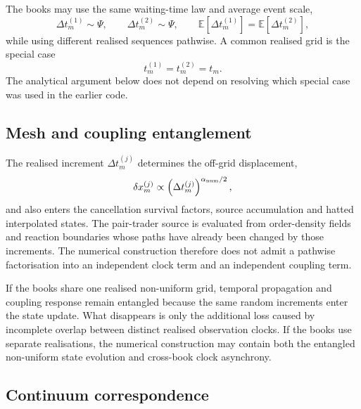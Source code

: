 \documentclass[5p,final]{elsarticle}
\begin{document}
The books may use the same waiting-time law and average event scale,
\begin{equation}
    \Delta t_m^{(1)}\sim\Psi,
    \qquad
    \Delta t_m^{(2)}\sim\Psi,
    \qquad
    \mathbb E[\Delta t_m^{(1)}]
    =\mathbb E[\Delta t_m^{(2)}],
\end{equation}
while using different realised sequences pathwise. A common realised grid is the special case
\begin{equation}
    t_m^{(1)}=t_m^{(2)}=t_m.
\end{equation}
The analytical argument below does not depend on resolving which special case was used in the earlier code.

\subsection{Mesh and coupling entanglement}

The realised increment $\Delta t_m^{(j)}$ determines the off-grid displacement,
\begin{equation}
    \delta x_m^{(j)}
    \propto
    \left(\Delta t_m^{(j)}\right)^{\alpha_{\rm num}/2},
\end{equation}
and also enters the cancellation survival factors, source accumulation and hatted interpolated states. The pair-trader source is evaluated from order-density fields and reaction boundaries whose paths have already been changed by those increments. The numerical construction therefore does not admit a pathwise factorisation into an independent clock term and an independent coupling term.

If the books share one realised non-uniform grid, temporal propagation and coupling response remain entangled because the same random increments enter the state update. What disappears is only the additional loss caused by incomplete overlap between distinct realised observation clocks. If the books use separate realisations, the numerical construction may contain both the entangled non-uniform state evolution and cross-book clock asynchrony.

\subsection{Continuum correspondence}
\end{document}
